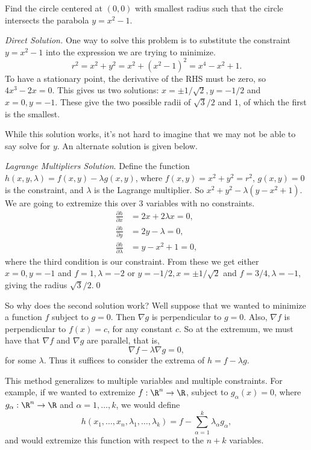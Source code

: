 \documentclass[a4paper]{scrartcl}
\begin{document}
\begin{example}
	Find the circle centered at $(0, 0)$ with smallest radius such that the circle intersects the parabola $y = x^2 - 1$.
\end{example}
\begin{proof}[Direct Solution]
	One way to solve this problem is to substitute the constraint $y = x^2 - 1$ into the expression we are trying to minimize.
	$$
	r^2 = x^2 + y^2 = x^2 + (x^2 - 1)^2 = x^4 - x^2 + 1.
	$$	
	To have a stationary point, the derivative of the RHS must be zero, so $4x^3 - 2x = 0$. This gives us two solutions: $x = \pm 1/\sqrt{2}, y = - 1/2$ and $x = 0, y = -1$. These give the two possible radii of $\sqrt{3}/2$ and $1$, of which the first is the smallest. \qedhere

	While this solution works, it's not hard to imagine that we may not be able to say solve for $y$. An alternate solution is given below.

	\emph{Lagrange Multipliers Solution}. Define the function $h(x, y, \lambda) = f(x, y) - \lambda g(x, y)$, where $f(x, y) = x^2 + y^2 = r^2$, $g(x, y) = 0$ is the constraint, and $\lambda$ is the Lagrange multiplier. So $x^2 + y^2 - \lambda (y - x^2 + 1)$. We are going to extremize this over 3 variables with no constraints.
	\begin{align*}
		\frac{\partial h}{\partial x} &= 2x + 2 \lambda x = 0, \\
		\frac{\partial h}{\partial y} &= 2y - \lambda  = 0, \\
		\frac{\partial h}{\partial \lambda} &= y - x^2 + 1 = 0,
	\end{align*}
	where the third condition is our constraint.
	From these we get either $x = 0, y = -1$ and $f = 1, \lambda = -2$ or $y = -1/2, x = \pm 1 / \sqrt{2}$ and $f = 3/4, \lambda = -1$, giving the radius $\sqrt{3}/2$.\qed
\end{proof}

So why does the second solution work? Well suppose that we wanted to minimize a function $f$ subject to $g = 0$. Then $\nabla g$ is perpendicular to $g = 0$. Also, $\nabla f$ is perpendicular to $f(x) = c$, for any constant $c$. So at the extremum, we must have that $\nabla f$ and $\nabla g$ are parallel, that is,
$$
\nabla f - \lambda \nabla g = 0,
$$
for some $\lambda$. Thus it suffices to consider the extrema of $h = f - \lambda g$.

This method generalizes to multiple variables and multiple constraints. For example, if we wanted to extremize $f: \R^n \rightarrow \R$, subject to $g_{\alpha}(x) = 0$, where $g_{\alpha}: \R^n \rightarrow \R$ and $\alpha = 1, \dots, k$, we would define
$$
h(x_1, \dots, x_n, \lambda_1, \dots, \lambda_k) = f - \sum_{\alpha=1}^k \lambda_{\alpha} g_{\alpha},
$$
and would extremize this function with respect to the $n + k$ variables.
\end{document}
